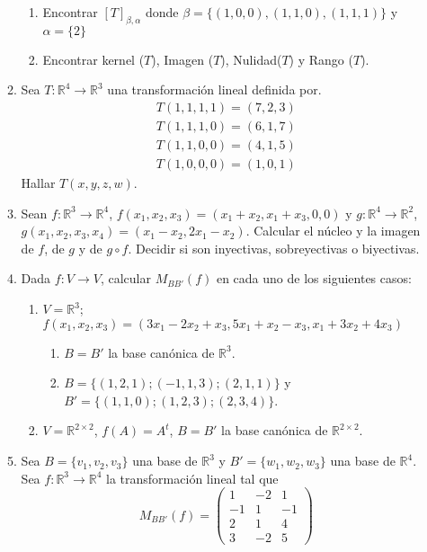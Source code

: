 \documentclass[12pt,letterpaper]{article}
\begin{document}
\begin{enumerate}
\begin{enumerate}
$$  $$
  \begin{enumerate}
    \item Encontrar $[T]_{\beta,\alpha}$ donde $\beta = \{(1,0,0),(1,1,0),(1,1,1)\}$ y $\alpha =\{2\}$
    \item  Encontrar kernel ($T$), Imagen ($T$), Nulidad($T$) y Rango ($T$).
  \end{enumerate}
  \item Sea $T: \mathbb{R}^4\to\mathbb{R}^3$ una transformación lineal definida por.
  \begin{align*}
    T(1,1,1,1) = (7,2,3)\\
    T(1,1,1,0) =(6,1,7)\\
    T(1,1,0,0) = (4,1,5)\\
    T(1,0,0,0) = (1,0,1)
  \end{align*}
  Hallar $T( x,y,z,w)$.
  \item Sean $f : \mathbb{R}^3\to\mathbb{R}^4$, $f(x_1, x_2, x_3) = (x_1+x_2, x_1+x_3, 0, 0)$ y $g : \mathbb{R}^4\to\mathbb{R}^2$, $g(x_1, x_2, x_3, x_4) = (x_1 - x_2, 2x_1 - x_2)$. Calcular el núcleo y la imagen de $f$, de $g$ y de $g \circ  f$. Decidir si son inyectivas, sobreyectivas o biyectivas.
  \item Dada $f : V \to V$, calcular $M_{BB'}(f)$ en cada uno de los siguientes casos:
  \begin{enumerate}
    \item $V = \mathbb{R}^3$; $f(x_1, x_2, x_3) = (3x_1 - 2x_2 + x_3, 5x_1 + x_2 - x_3, x_1 + 3x_2 + 4x_3)$
    \begin{enumerate}
      \item $B = B'$ la base canónica de $\mathbb{R}^3$.
      \item $B = \{(1, 2, 1); (-1, 1, 3); (2, 1, 1)\}$ y $B' = \{(1, 1, 0); (1, 2, 3); (2, 3, 4)\}$.
    \end{enumerate}
    \item $V = \mathbb{R}^{2\times2}$, $f(A) = A^t$, $B = B'$ la base canónica de $\mathbb{R}^{2\times2}$.
  \end{enumerate}
  \item Sea $B = \{v_1, v_2, v_3\}$ una base de $\mathbb{R}^3$ y $B' = \{w_1, w_2, w_3\}$ una base de $\mathbb{R}^4$. Sea $f : \mathbb{R}^3\to\mathbb{R}^4$ la transformación lineal tal que
  $$
  M_{BB'}(f) = \begin{pmatrix}
    1 & -2 & 1\\
    -1 & 1 & -1\\
    2 & 1 & 4\\
    3 & -2 & 5

\end{pmatrix}$$
\end{enumerate}
\end{enumerate}
\end{document}
